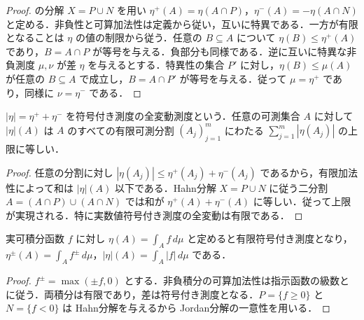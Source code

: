 \begin{proof}
 の分解 $X=P\cup N$ を用い $\eta^+(A)=\eta(A\cap P)$，$\eta^-(A)=-\eta(A\cap N)$ と定める．非負性と可算加法性は定義から従い，互いに特異である．一方が有限となることは $\eta$ の値の制限から従う．任意の $B\subseteq A$ について $\eta(B)\leq\eta^+(A)$ であり，$B=A\cap P$ が等号を与える．負部分も同様である．逆に互いに特異な非負測度 $\mu,\nu$ が差 $\eta$ を与えるとする．特異性の集合 $P'$ に対し，$\eta(B)\leq\mu(A)$ が任意の $B\subseteq A$ で成立し，$B=A\cap P'$ が等号を与える．従って $\mu=\eta^+$ であり，同様に $\nu=\eta^-$ である．
\end{proof}
\begin{prop}[全変動測度]
$\lvert\eta\rvert=\eta^++\eta^-$ を符号付き測度の全変動測度という．任意の可測集合 $A$ に対して $\lvert\eta\rvert(A)$ は $A$ のすべての有限可測分割 $(A_j)_{j=1}^m$ にわたる $\sum_{j=1}^m|\eta(A_j)|$ の上限に等しい．
\end{prop}
\begin{proof}
任意の分割に対し $|\eta(A_j)|\leq\eta^+(A_j)+\eta^-(A_j)$ であるから，有限加法性によって和は $\lvert\eta\rvert(A)$ 以下である．Hahn分解 $X=P\cup N$ に従う二分割 $A=(A\cap P)\cup(A\cap N)$ では和が $\eta^+(A)+\eta^-(A)$ に等しい．従って上限が実現される．特に実数値符号付き測度の全変動は有限である．
\end{proof}
\begin{example}[可積分函数が定める符号付き測度]
実可積分函数 $f$ に対し $\eta(A)=\int_A f\,d\mu$ と定めると有限符号付き測度となり，$\eta^\pm(A)=\int_A f^\pm\,d\mu$，$|\eta|(A)=\int_A|f|\,d\mu$ である．
\end{example}
\begin{proof}
$f^\pm=\max(\pm f,0)$ とする．非負積分の可算加法性は指示函数の級数と  に従う．両積分は有限であり，差は符号付き測度となる．$P=\{f\geq0\}$ と $N=\{f<0\}$ は Hahn分解を与えるから Jordan分解の一意性を用いる．
\end{proof}
